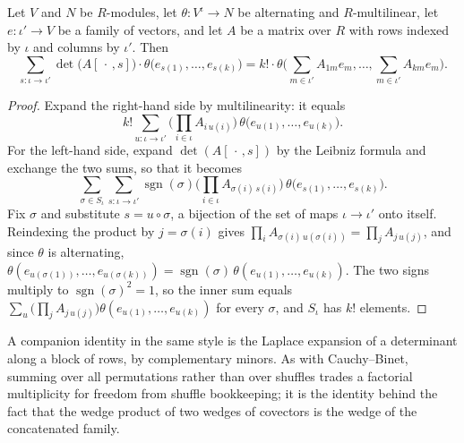 \begin{lemma}
\label{lem:alternating-cauchy-binet}
\leanok
Let $V$ and $N$ be $R$-modules, let $\theta \colon V^{\iota} \to N$ be alternating and $R$-multilinear, let $e \colon \iota' \to V$ be a family of vectors, and let $A$ be a matrix over $R$ with rows indexed by $\iota$ and columns by $\iota'$. Then
\[
\sum_{s \colon \iota \to \iota'} \det\big(A[\,\cdot\,, s]\big) \cdot \theta\big(e_{s(1)}, \ldots, e_{s(k)}\big) = k! \cdot \theta\Big(\sum_{m \in \iota'} A_{1m} e_m, \ldots, \sum_{m \in \iota'} A_{km} e_m\Big).
\]
\end{lemma}
\begin{proof}
\leanok
Expand the right-hand side by multilinearity: it equals
\[
k! \sum_{u \colon \iota \to \iota'} \Big(\prod_{i \in \iota} A_{i\,u(i)}\Big)\,\theta\big(e_{u(1)}, \ldots, e_{u(k)}\big).
\]
For the left-hand side, expand $\det(A[\,\cdot\,, s])$ by the Leibniz formula and exchange the two sums, so that it becomes
\[
\sum_{\sigma \in S_\iota} \sum_{s \colon \iota \to \iota'} \operatorname{sgn}(\sigma)\Big(\prod_{i \in \iota} A_{\sigma(i)\,s(i)}\Big)\,\theta\big(e_{s(1)}, \ldots, e_{s(k)}\big).
\]
Fix $\sigma$ and substitute $s = u \circ \sigma$, a bijection of the set of maps $\iota \to \iota'$ onto itself. Reindexing the product by $j = \sigma(i)$ gives $\prod_{i} A_{\sigma(i)\,u(\sigma(i))} = \prod_{j} A_{j\,u(j)}$, and since $\theta$ is alternating, $\theta(e_{u(\sigma(1))}, \ldots, e_{u(\sigma(k))}) = \operatorname{sgn}(\sigma)\,\theta(e_{u(1)}, \ldots, e_{u(k)})$. The two signs multiply to $\operatorname{sgn}(\sigma)^2 = 1$, so the inner sum equals $\sum_{u} \big(\prod_{j} A_{j\,u(j)}\big)\theta(e_{u(1)}, \ldots, e_{u(k)})$ for every $\sigma$, and $S_\iota$ has $k!$ elements.
\end{proof}

A companion identity in the same style is the Laplace expansion of a determinant along a block of rows, by complementary minors. As with Cauchy--Binet, summing over all permutations rather than over shuffles trades a factorial multiplicity for freedom from shuffle bookkeeping; it is the identity behind the fact that the wedge product of two wedges of covectors is the wedge of the concatenated family.


